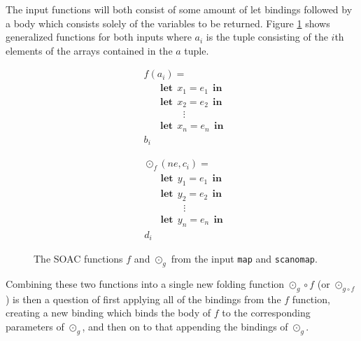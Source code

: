 \documentclass[11pt]{article}
\newcommand\lett{\phantom{-}\:\:\mathbf{let}\:\:}
\newcommand\inn{\:\:\mathbf{in}\:\:}
\begin{document}
The input functions will both consist of some amount of let bindings followed by a body which consists solely of the variables to be returned. Figure \ref{fig:bothfuns} shows generalized functions for both
 inputs where $a_i$ is the tuple consisting of the $i$th elements of the arrays contained in the $a$ tuple. 
 \begin{figure}[hb!]
   \begin{mdframed}[style=alignbox]
 \begin{minipage}{0.5\linewidth}
     \centering
       \begin{align*}
         &f(a_i) = \\
         &\lett x_1 = e_1 \inn\\
         &\lett x_2 = e_2 \inn\\
         &\phantom{----}\vdots\\
         &\lett x_n = e_n \inn\\
         &b_i
       \end{align*}
     \label{fig:mapf}
 \end{minipage}
 \begin{minipage}{0.5\linewidth}
     \centering
     \begin{align*}
       &\odot_f(ne, c_i) = \\
       &\lett y_1 = e_1 \inn\\
       &\lett y_2 = e_2 \inn\\
       &\phantom{----}\vdots\\
       &\lett y_n = e_n \inn\\
       &d_i
     \end{align*}
     \label{fig:odotg}
   \end{minipage}

     \end{mdframed}
     \caption{The SOAC functions $f$ and $\odot_g$ from the input
       \texttt{map} and \texttt{scanomap}.}
     \label{fig:bothfuns}
\end{figure}

Combining these two functions into a single new folding function $\odot_g \circ f$ (or $\odot_{g \circ f}$) is then a question of first applying all of the bindings
 from the $f$ function, creating a new binding which binds the body of $f$ to the corresponding parameters of $\odot_g$, and then on
 to that appending the bindings of $\odot_g$.
\end{document}
